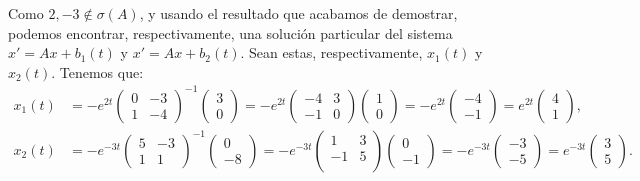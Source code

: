 \begin{ejercicio}
    Como $2, -3\notin \sigma(A)$, y usando el resultado que acabamos de demostrar, podemos encontrar, respectivamente, una solución particular del sistema $x'=Ax+b_1(t)$ y $x'=Ax+b_2(t)$. Sean estas, respectivamente, $x_1(t)$ y $x_2(t)$. Tenemos que:
    \begin{align*}
        x_1(t) &= -e^{2t}\begin{pmatrix}
            0 & -3\\
            1 & -4
        \end{pmatrix}^{-1}\begin{pmatrix}
            3\\
            0
        \end{pmatrix}
        = -e^{2t}\begin{pmatrix}
            -4 & 3\\
            -1 & 0
        \end{pmatrix}\begin{pmatrix}
            1\\
            0
        \end{pmatrix}
        = -e^{2t}\begin{pmatrix}
            -4\\
            -1
        \end{pmatrix}
        = e^{2t}\begin{pmatrix}
            4\\
            1
        \end{pmatrix},\\
        x_2(t) &= -e^{-3t}\begin{pmatrix}
            5 & -3\\
            1 & 1
        \end{pmatrix}^{-1}\begin{pmatrix}
            0\\
            -8
        \end{pmatrix}
        = -e^{-3t}\begin{pmatrix}
            1 & 3\\
            -1 &5\\
        \end{pmatrix}\begin{pmatrix}
            0\\
            -1
        \end{pmatrix}
        = -e^{-3t}\begin{pmatrix}
            -3\\
            -5
        \end{pmatrix}
        = e^{-3t}\begin{pmatrix}
            3\\
            5
        \end{pmatrix}.
    \end{align*}


\end{ejercicio}

